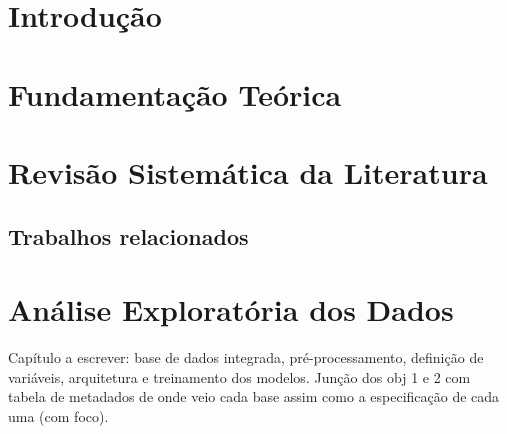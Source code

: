 \documentclass[mestrado,qualificacao]{packages/ppg}
\newif\ifmostrarnotas   \mostrarnotastrue
\newcommand{\pendente}[1]{\ifmostrarnotas
  \par\noindent\colorbox{yellow!60}{\parbox{\dimexpr\linewidth-2\fboxsep\relax}{\raggedright #1}}\par
  \else #1\fi}
\begin{document}



\textual

\chapter{Introdução}
\label{chp:introducao}


\chapter{Fundamentação Teórica}
\label{chp:fundamentacao}


\chapter{Revisão Sistemática da Literatura}
\label{chp:cientometrica}


\section{Trabalhos relacionados}
\label{sec:trabalhos-relacionados}


\chapter{Análise Exploratória dos Dados}
\label{chp:ead}

\pendente{Capítulo a escrever: base de dados integrada, pré-processamento, definição de variáveis, arquitetura e treinamento dos modelos. Junção dos obj 1 e 2 com tabela de metadados de onde veio cada base assim como a especificação de cada uma (com foco).}

\end{document}
